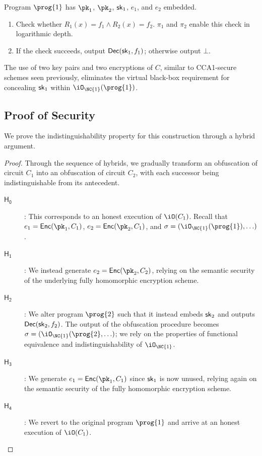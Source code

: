 \documentclass[12pt]{tufte-book}
\newcommand{\Enc}{\mathsf{Enc}}
\newcommand{\Dec}{\mathsf{Dec}}
\begin{document}
Program $\prog{1}$ has $\pk_1$, $\pk_2$, $\mathsf{sk}_1$, $e_1$, and $e_2$
embedded.
\begin{enumerate}
\item
	Check whether $R_1(x) = f_1 \land R_2(x) = f_2$.
	$\pi_1$ and $\pi_2$ enable this check in logarithmic depth.
\item
	If the check succeeds, output $\Dec(\sk_1, f_1)$;
	otherwise output $\bot$.
\end{enumerate}

The use of two key pairs and two encryptions of $C$, similar to
CCA1-secure schemes seen previously, eliminates the virtual black-box
requirement for concealing $\mathsf{sk}_1$ within $\iO_{\NC{1}}(\prog{1})$.

\subsection{Proof of Security}

We prove the indistinguishability property for this construction
through a hybrid argument.

\newcommand{\Hyb}[1]{\ensuremath{\mathsf{H_{#1}}}}
\begin{proof}
Through the sequence of hybrids, we gradually transform an obfuscation
of circuit $C_1$ into an obfuscation of circuit $C_2$, with each
successor being indistinguishable from its antecedent.
\begin{description}
\item[$\Hyb{0}$]:
	This corresponds to an honest execution of $\iO(C_1)$.
	Recall that $e_1 = \Enc(\pk_1, C_1)$, $e_2 = \Enc(\pk_2, C_1)$,
	and $\sigma = (\iO_{\NC{1}}(\prog{1}), \ldots)$.

\item[$\Hyb{1}$]:
	We instead generate $e_2 = \Enc(\pk_2, C_2)$, relying on the
	semantic security of the underlying fully homomorphic encryption
	scheme.

\item[$\Hyb{2}$]:
	We alter program $\prog{2}$ such that it instead embeds $\mathsf{sk}_2$
	and outputs $\Dec(\sk_2, f_2)$.
	The output of the obfuscation procedure becomes
	$\sigma = (\iO_{\NC{1}}(\prog{2}, \ldots)$;
	we rely on the properties of functional equivalence and
	indistinguishability of $\iO_{\NC{1}}$.

\item[$\Hyb{3}$]:
	We generate $e_1 = \Enc(\pk_1, C_1)$ since $\mathsf{sk}_1$ is now
	unused, relying again on the semantic security of the fully
	homomorphic encryption scheme.

\item[$\Hyb{4}$]:
	We revert to the original program $\prog{1}$ and arrive
	at an honest execution of $\iO(C_1)$.

\end{description}
\end{proof}
\end{document}

